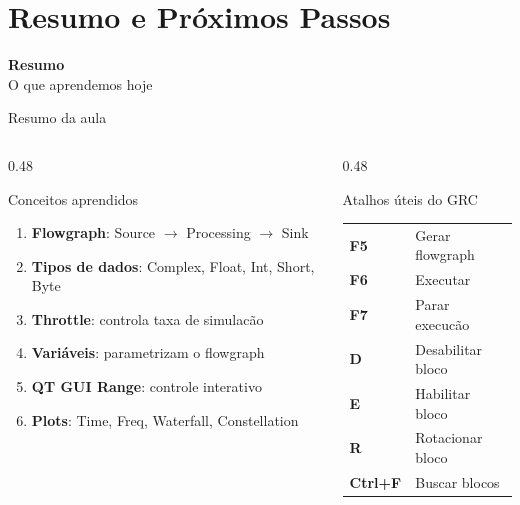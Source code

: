 \documentclass[aspectratio=169]{beamer}
\begin{document}
\section{Resumo e Pr\'{o}ximos Passos}

{
\begin{frame}[plain,c]
\begin{center}
{\Huge\textbf{Resumo}}\\[0.8cm]
{\LARGE O que aprendemos hoje}
\end{center}
\end{frame}
}

\begin{frame}{Resumo da aula}
\begin{columns}
\begin{column}{0.48\textwidth}
  \begin{block}{Conceitos aprendidos}
  \begin{enumerate}\setlength{\itemsep}{2pt}
    \item \textbf{Flowgraph}: Source $\to$ Processing $\to$ Sink
    \item \textbf{Tipos de dados}: Complex, Float, Int, Short, Byte
    \item \textbf{Throttle}: controla taxa de simulac\~{a}o
    \item \textbf{Vari\'{a}veis}: parametrizam o flowgraph
    \item \textbf{QT GUI Range}: controle interativo
    \item \textbf{Plots}: Time, Freq, Waterfall, Constellation
  \end{enumerate}
  \end{block}
\end{column}
\begin{column}{0.48\textwidth}
  \begin{exampleblock}{Atalhos \'{u}teis do GRC}
  \small
  \begin{tabular}{ll}
    \textbf{F5} & Gerar flowgraph \\
    \textbf{F6} & Executar \\
    \textbf{F7} & Parar execuc\~{a}o \\
    \textbf{D}  & Desabilitar bloco \\
    \textbf{E}  & Habilitar bloco \\
    \textbf{R}  & Rotacionar bloco \\
    \textbf{Ctrl+F} & Buscar blocos \\
  \end{tabular}
  \end{exampleblock}
\end{column}
\end{columns}
\end{frame}
\end{document}
